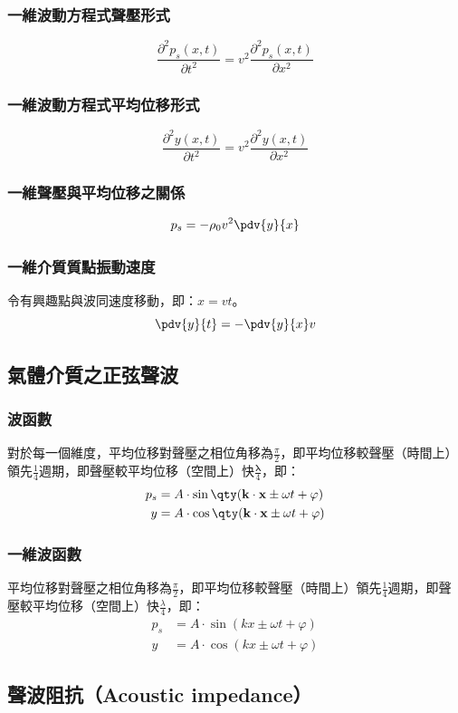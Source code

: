 \documentclass[a4paper,12pt]{report}
\begin{document}
\subsubsection {一維波動方程式聲壓形式}
\[\frac{\partial^2 p_s(x, t)}{\partial t^2} = v^2 \frac{\partial^2 p_s(x, t)}{\partial x^2}\]
\subsubsection {一維波動方程式平均位移形式}
\[\frac{\partial^2 y(x, t)}{\partial t^2} = v^2 \frac{\partial^2 y(x, t)}{\partial x^2}\]
\subsubsection {一維聲壓與平均位移之關係}
\[p_s = -\rho_0 v^2 \pdv{y}{x}\]
\subsubsection{一維介質質點振動速度}
令有興趣點與波同速度移動，即：$x=vt$。
\[ \pdv{y}{t}=-\pdv{y}{x}v \]
\subsection {氣體介質之正弦聲波}
\subsubsection{波函數}
對於每一個維度，平均位移對聲壓之相位角移為$\frac{\pi}{2}$，即平均位移較聲壓（時間上）領先$\frac{1}{4}$週期，即聲壓較平均位移（空間上）快$\frac{\mathbf{\lambda}}{4}$，即：
\[\begin{aligned}
p_s &= A \cdot \sin\qty(\mathbf{k} \cdot \mathbf{x} \pm \omega t + \varphi) \\
y &= A \cdot \cos\qty(\mathbf{k} \cdot \mathbf{x} \pm \omega t + \varphi) 
\end{aligned}\]
\subsubsection{一維波函數}
平均位移對聲壓之相位角移為$\frac{\pi}{2}$，即平均位移較聲壓（時間上）領先$\frac{1}{4}$週期，即聲壓較平均位移（空間上）快$\frac{\lambda}{4}$，即：
\[\begin{aligned}
p_s &=A\cdot\sin(kx\pm\omega t+\varphi)\\
y &=A\cdot\cos(kx\pm\omega t+\varphi)
\end{aligned}\]
\subsection{聲波阻抗（Acoustic impedance）}
\end{document}
